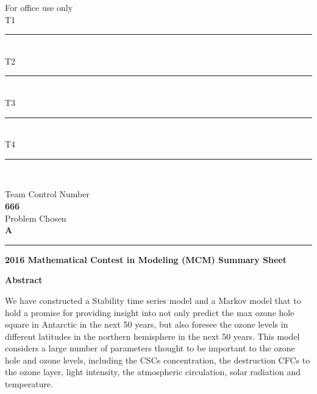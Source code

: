 \documentclass[12pt]{article}
\begin{document}

\thispagestyle{empty}
\begin{minipage}{0.3\textwidth}
\begin{flushleft}
For office use only\\
   T1\ \rule{3cm}{0.5pt}\\
   T2\ \rule{3cm}{0.5pt}\\
   T3\ \rule{3cm}{0.5pt}\\
   T4\ \rule{3cm}{0.5pt}\\
\end{flushleft}
\end{minipage}\hspace{\fill}
\begin{minipage}{0.3\textwidth}
\centering
Team Control Number\\[5pt]
\fontsize{36pt}{\baselineskip}\selectfont  \textbf{666} \normalsize\\[10pt]
Problem Chosen\\[5pt]
\fontsize{18pt}{\baselineskip}\selectfont \textbf{A }\normalsize\\
\end{minipage}\hfill
\begin{minipage}{0.35\textwidth}
\begin{flushright}
\end{flushright}
\end{minipage}\vspace*{10pt}
\rule{\textwidth}{0.5pt}

\begin{center}
  \textbf{2016 Mathematical Contest in Modeling (MCM) Summary Sheet}
\end{center}
\noindent
{\Large \textbf{Abstract}}
\vspace{7pt}

We have constructed a Stability time series model and a Markov model that to hold a promise for providing insight into not only predict the max ozone hole square in Antarctic in the next 50 years, but also foresee the ozone levels in different latitudes in the northern hemisphere in the next 50 years. This model considers a large number of parameters thought to be important to the ozone hole and ozone levels, including the CSCs concentration, the destruction CFCs to the ozone layer, light intensity, the atmospheric circulation, solar radiation and temperature. 
\end{document}
